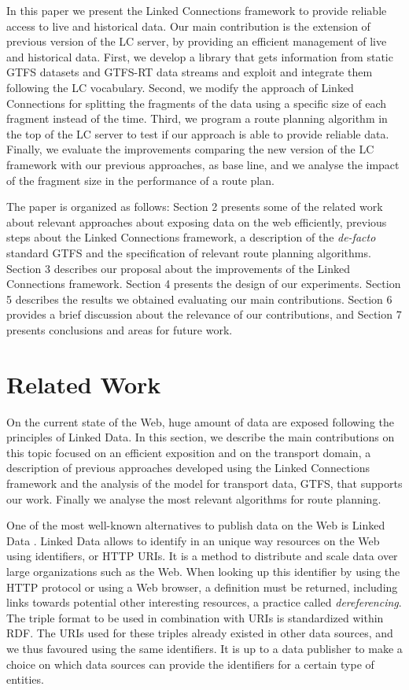 \documentclass[sw]{iosart2x}
\begin{document}
In this paper we present the Linked Connections framework to provide reliable access to live and historical data. Our main contribution is the extension of previous version of the LC server, by providing an efficient management of live and historical data. First, we develop a library that gets information from static GTFS datasets and GTFS-RT data streams and exploit and integrate them following the LC vocabulary. Second, we modify the approach of Linked Connections for splitting the fragments of the data using a specific size of each fragment instead of the time. Third, we program a route planning algorithm in the top of the LC server to test if our approach is able to provide reliable data. Finally, we evaluate the improvements comparing the new version of the LC framework with our previous approaches, as base line, and we analyse the impact of the fragment size in the performance of a route plan.

The paper is organized as follows: Section 2 presents some of the related work about relevant approaches about exposing data on the web efficiently,  previous steps about the Linked Connections framework, a description of the \textit{de-facto} standard GTFS and the specification of relevant route planning algorithms. Section 3 describes our proposal about the improvements of the Linked Connections framework. Section 4 presents the design of our experiments. Section 5 describes the results we obtained evaluating our main contributions. Section 6 provides a brief discussion about the relevance of our contributions, and Section 7 presents conclusions and areas for future work.


\section{Related Work}\label{related_work} %
On the current state of the Web, huge amount of data are exposed following the principles of Linked Data. In this section, we describe the main contributions on this topic focused on an efficient exposition and on the transport domain, a description of previous approaches developed using the Linked Connections framework and the analysis of the model for transport data, GTFS, that supports our work. Finally we analyse the most relevant algorithms for route planning.

One of the most well-known alternatives to publish data on the Web is Linked Data \cite{bizer2009linked}. Linked Data allows to identify in an unique way resources on the Web using identifiers, or HTTP URIs. It is a method to distribute and scale data over large organizations such as the Web. When looking up this identifier by using the HTTP protocol or using a Web browser, a definition must be returned, including links towards potential other interesting resources, a practice called \textit{dereferencing}. The triple format to be used in combination with URIs is standardized within RDF. The URIs used for these triples already existed in other data sources, and we thus favoured using the same identifiers. It is up to a data publisher to make a choice on which data sources can provide the identifiers for a certain type of entities. 
\end{document}
